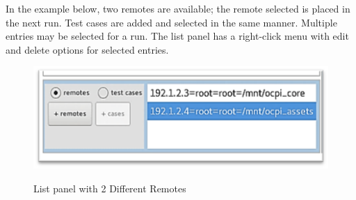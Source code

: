 \documentclass[10pt, a4paper, oneside]{article}
\begin{document}
In the example below, two remotes are available; the remote selected is placed in the next run. Test cases are added and selected in the same manner. Multiple entries may be selected for a run. The list panel has a right-click menu with edit and delete options for selected entries.
\begin{figure}[h!]
    \centering
   \caption{List panel with 2 Different Remotes}
    \includegraphics[width=.95\textwidth]{ListPanelwithRemotes.png}
    \label{fig:List panel with 2 Different Remotes}
\end{figure}
\end{document}

